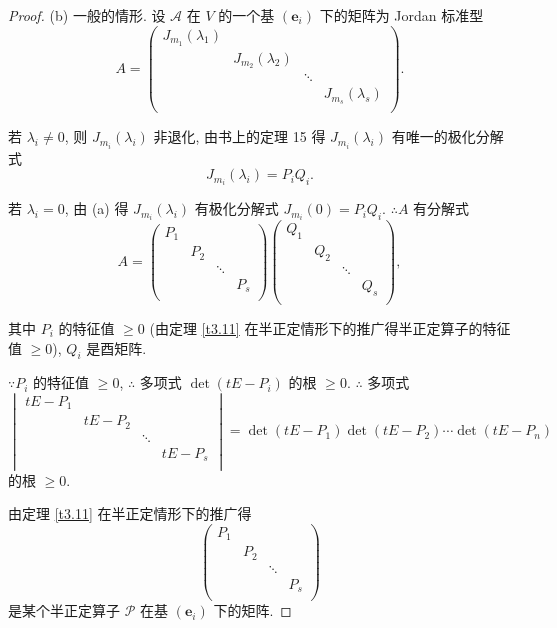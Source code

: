 \documentclass[color=black,device=normal,lang=cn,mode=geye]{elegantnote}
\begin{document}
\begin{proof}
    (b) 一般的情形. 设 $\mathcal{A}$ 在 $V$ 的一个基 $(\boldsymbol{e}_i)$ 下的矩阵为 Jordan 标准型
    \[A=\begin{pmatrix}
        J_{m_1}(\lambda_1) \\
        & J_{m_2}(\lambda_2) \\
        && \ddots \\
        &&& J_{m_s}(\lambda_s) \\
    \end{pmatrix}.\]

    若 $\lambda_i\neq0$, 则 $J_{m_i}(\lambda_i)$ 非退化, 由书上的定理 15 得 $J_{m_i}(\lambda_i)$ 有唯一的极化分解式
    \[J_{m_i}(\lambda_i)=P_iQ_i.\]
    
    若 $\lambda_i=0$, 由 (a) 得 $J_{m_i}(\lambda_i)$ 有极化分解式 $J_{m_i}(0)=P_iQ_i$. $\therefore A$ 有分解式
    \begin{equation}\label{eq3.6}
        A=\begin{pmatrix}
            P_1 \\
            & P_2 \\
            && \ddots \\
            &&& P_s \\
        \end{pmatrix}\begin{pmatrix}
            Q_1 \\
            & Q_2 \\
            && \ddots \\
            &&& Q_s \\
        \end{pmatrix},
    \end{equation}

    其中 $P_i$ 的特征值 $\geq0$ (由定理 \ref{t3.11} 在半正定情形下的推广得半正定算子的特征值 $\geq0$), $Q_i$ 是酉矩阵.

    $\because P_i$ 的特征值 $\geq0$, $\therefore$ 多项式 $\det(tE-P_i)$ 的根 $\geq0$. $\therefore$ 多项式
    \[\begin{vmatrix}
        tE-P_1 \\
        & tE-P_2 \\
        && \ddots \\
        &&& tE-P_s \\
    \end{vmatrix}=\det(tE-P_1)\det(tE-P_2)\cdots\det(tE-P_n)\]
    的根 $\geq0$.

    由定理 \ref{t3.11} 在半正定情形下的推广得
    \[\begin{pmatrix}
        P_1 \\
        & P_2 \\
        && \ddots \\
        &&& P_s \\
    \end{pmatrix}\]
    是某个半正定算子 $\mathcal{P}$ 在基 $(\boldsymbol{e}_i)$ 下的矩阵.


\end{proof}
\end{document}
